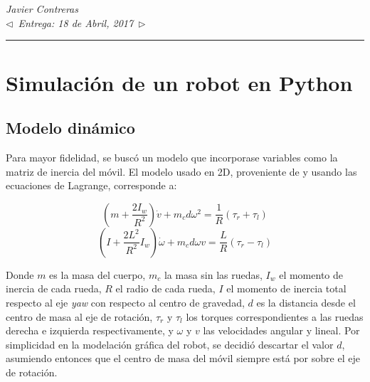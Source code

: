 \documentclass[11pt,letterpaper,twoside]{report}%
\def\doctitle{Tarea 3}
\def\docsubtitle{Entrega: 18 de Abril, 2017}
\def\group{Javier Contreras}
\begin{document}
\noindent
%
\mbox{}\\[-0.5\baselineskip]
{\centering
{\bu{\Large \doctitle}}\\
{\textit{\group}\\}
{\small {\em $\triangleleft$~\docsubtitle~$\triangleright$}}\\[-.0\baselineskip]}
\rule[0ex]{\textwidth}{.4pt}

\thispagestyle{plain}


%
\section{Simulaci\'on de un robot en Python}

\subsection{Modelo din\'amico}
Para mayor fidelidad, se busc\'o un modelo que incorporase variables como la matriz de inercia del m\'ovil. El modelo usado en 2D, proveniente de \cite[pg. 5]{model} y usando las ecuaciones de Lagrange, corresponde a:

\begin{equation*}
(m+\frac{2I_w}{R^2})\dot{v}+m_cd\omega^2=\frac{1}{R}(\tau_r+\tau_l)
\end{equation*}
\begin{equation*}
(I+\frac{2L^2}{R^2}I_w)\dot{\omega}+m_cd\omega v=\frac{L}{R}(\tau_r-\tau_l)
\end{equation*}

Donde $m$ es la masa del cuerpo, $m_c$ la masa sin las ruedas, $I_w$ el momento de inercia de cada rueda, $R$ el radio de cada rueda, $I$ el momento de inercia total respecto al eje \textit{yaw} con respecto al centro de gravedad, $d$ es la distancia desde el centro de masa al eje de rotaci\'on, $\tau_r$ y $\tau_l$ los torques correspondientes a las ruedas derecha e izquierda respectivamente, y $\omega$ y $v$ las velocidades angular y lineal. Por simplicidad en la modelaci\'on gr\'afica del robot, se decidi\'o descartar el valor $d$, asumiendo entonces que el centro de masa del m\'ovil siempre est\'a por sobre el eje de rotaci\'on.
\end{document}
